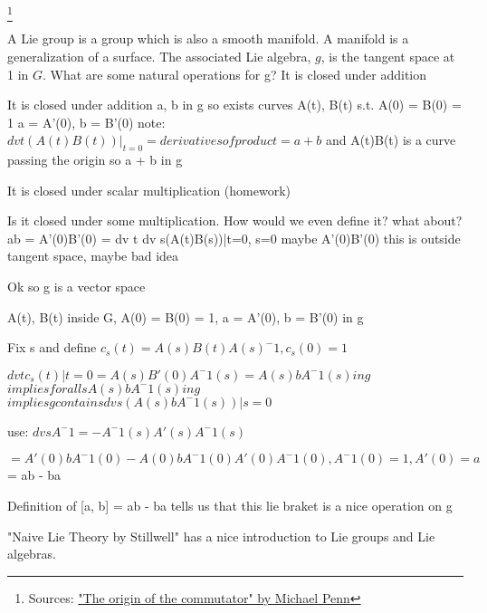\footnote{Sources:
  \href{https://youtu.be/2_KVbtyufq8?si=KxYFdZ__YfD6ZzKm}
  {"The origin of the commutator" by Michael Penn}
}

\begin{multicols}{3}
  A Lie group is a group which is also a smooth manifold. A manifold is a generalization of a surface.
  The associated Lie algebra, $g$, is the tangent space at 1 in $G$.
  What are some natural operations for g?
  It is closed under addition
\end{multicols}



It is closed under addition
a, b in g
so
exists curves A(t), B(t) s.t.
A(0) = B(0) = 1
a = A'(0), b = B'(0)
note:
$dv t (A(t)B(t))|_{t=0} = derivatives of product = a + b$
and A(t)B(t) is a curve passing the origin so
a + b in g

It is closed under scalar multiplication (homework)

Is it closed under some multiplication. How would we even define it?
what about?
ab = A'(0)B'(0) = dv t dv s(A(t)B(s))|t=0, s=0
maybe A'(0)B'(0) this is outside tangent space, maybe bad idea

Ok so g is a vector space

A(t), B(t) inside G, A(0) = B(0) = 1, a = A'(0), b = B'(0) in g

Fix s and define
$c_s(t) = A(s)B(t)A(s)^-1, c_s(0) = 1$

$dv t c_s(t)|t=0 = A(s)B'(0)A^-1(s) = A(s)bA^-1(s) in g$
$implies forall s A(s)bA^-1(s) in g$
$implies g contains dv s (A(s)bA^-1(s))|s=0$

use:
$dv s A^-1 = -A^-1(s)A'(s)A^-1(s)$

$= A'(0)bA^-1(0) - A(0)bA^-1(0)A'(0)A^-1(0), A^-1(0) = 1, A'(0) = a$
= ab - ba

Definition of [a, b] = ab - ba tells us that this lie braket is a nice
operation on g


"Naive Lie Theory by Stillwell" has a nice introduction to Lie groups
and Lie algebras.






